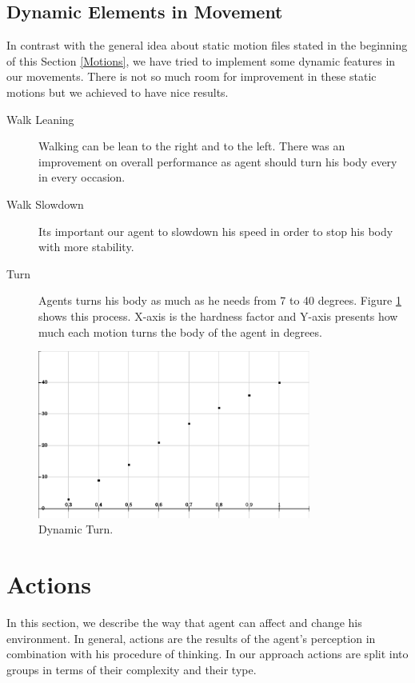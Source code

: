 \subsection{Dynamic Elements in Movement}
In contrast with the general idea about static motion files stated in the beginning of this Section \ref{Motions}, we have tried to implement some dynamic features in our movements. There is not so much room for improvement in these static motions but we achieved to have nice results.
\begin{description}
	\item[Walk Leaning] Walking can be lean to the right and to the left. There was an improvement on overall performance as agent should turn his body every in every occasion.
	\item[Walk Slowdown] Its important our agent to slowdown his speed in order to stop his body with more stability.
	\item[Turn]	Agents turns his body as much as he needs from 7 to 40 degrees. Figure \ref{fig:Turn} shows this process. X-axis is the hardness factor and Y-axis presents how much each motion turns the body of the agent in degrees.
\end{description} 
\begin{figure}[htb!]
\centering
  \includegraphics[width=0.8\textwidth]{Chapter3/figures/DynamicTurn.pdf}
  \caption{Dynamic Turn.}
  \label{fig:Turn}
\end{figure}


\section{Actions}
In this section, we describe the way that agent can affect and change his environment. In general, actions are the results of the agent's perception in combination with his procedure of thinking.
In our approach actions are split into groups in terms of their complexity and their type.

